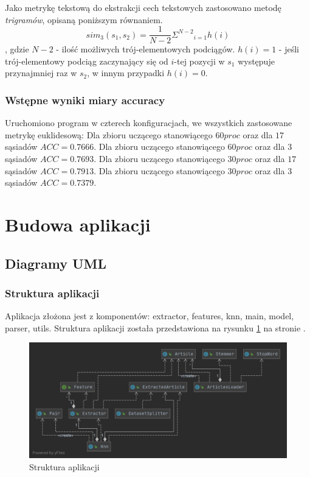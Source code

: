 \documentclass{classrep}
\begin{document}
Jako metrykę tekstową do ekstrakcji cech tekstowych zastosowano metodę \textit{trigramów}, opisaną poniższym równaniem.
\begin{equation}
sim_{3}(s_1,s_2) = \frac{1}{N-2} {{\Sigma}^{N-2}}_{i=1} h(i)\label{eq:eps}
\end{equation}
\newline , gdzie
\newline $N-2$ - ilość możliwych trój-elementowych podciągów.
\newline $h(i) = 1$ - jeśli trój-elementowy podciąg zaczynający się od $i$-tej pozycji w $s_1$ występuje przynajmniej raz w $s_2$, w innym przypadki $h(i)=0$.

\subsubsection{Wstępne wyniki miary accuracy}
Uruchomiono program w czterech konfiguracjach, we wszystkich zastosowane metrykę euklidesową:
\newline Dla zbioru uczącego stanowiącego $60 proc$ oraz dla $17$ sąsiadów $ACC=0.7666$.
\newline Dla zbioru uczącego stanowiącego $60 proc$ oraz dla $3$ sąsiadów $ACC=0.7693$.
\newline Dla zbioru uczącego stanowiącego $30 proc$ oraz dla $17$ sąsiadów $ACC=0.7913$.
\newline Dla zbioru uczącego stanowiącego $30 proc$ oraz dla $3$ sąsiadów $ACC=0.7379$.



\section{Budowa aplikacji}
\subsection{Diagramy UML}

\subsubsection{Struktura aplikacji}
Aplikacja złożona jest z komponentów: extractor, features, knn, main, model, parser, utils. Struktura aplikacji została przedstawiona na rysunku \ref{app} na stronie \pageref{app}.

\begin{figure}
\label{app}
\includegraphics[scale=0.35]{App structure}
\caption{Struktura aplikacji}
\end{figure}
\end{document}

